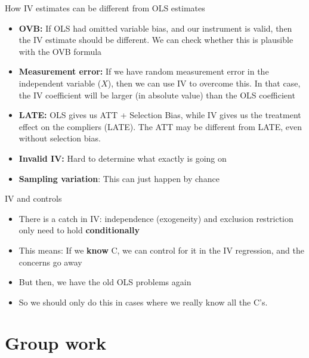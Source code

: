 \documentclass[11pt,xcolor=table]{beamer}
\begin{document}
\begin{frame}{How IV estimates can be different from OLS estimates}
    \begin{itemize}
        \item \textbf{OVB:} If OLS had omitted variable bias, and our instrument is valid, then the IV estimate should be different. We can check whether this is plausible with the OVB formula
        \item \textbf{Measurement error:} If we have random measurement error in the independent variable ($X$), then we can use IV to overcome this. In that case, the IV coefficient will be larger (in absolute value) than the OLS coefficient
        \item \textbf{LATE:} OLS gives us  ATT + Selection Bias, while IV gives us the treatment effect on the compliers (LATE). The ATT may be different from LATE, even without selection bias.
        \item \textbf{Invalid IV:} Hard to determine  what exactly is going on
        \item \textbf{Sampling variation}: This can just happen by chance
        
    \end{itemize}
    
\end{frame}











\begin{frame}{IV and controls}
    \begin{itemize}
        \item There is a catch in IV: independence (exogeneity) and exclusion restriction only need to hold \textbf{conditionally}
        \item This means: If we \textbf{know} C, we can control for it in the IV regression, and the concerns go away
        \item But then, we have the old OLS problems again
        \item So we should only do this in cases where we really know all the C's.    
    \end{itemize}
    
\end{frame}






\section{Group work}
\end{document}
